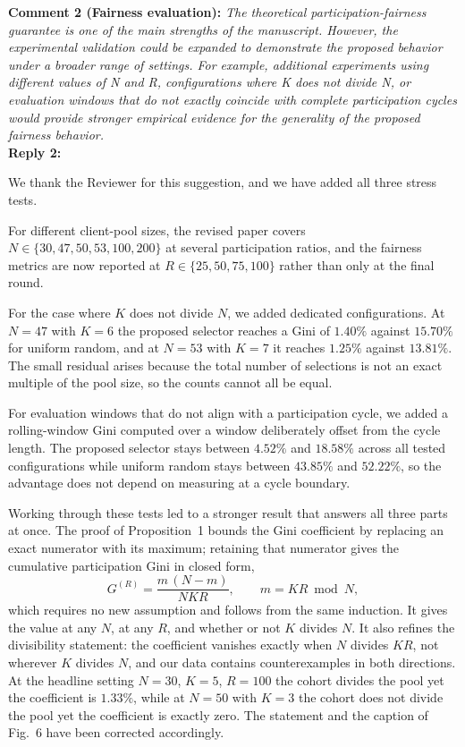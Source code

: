 \documentclass[10pt]{article}
\begin{document}
\noindent
\textbf{Comment 2 (Fairness evaluation):} \textit{The theoretical participation-fairness guarantee is one of the main strengths of the manuscript. However, the experimental validation could be expanded to demonstrate the proposed behavior under a broader range of settings. For example, additional experiments using different values of N and R, configurations where K does not divide N, or evaluation windows that do not exactly coincide with complete participation cycles would provide stronger empirical evidence for the generality of the proposed fairness behavior.} \\
\noindent
\textbf{Reply 2:} {We thank the Reviewer for this suggestion, and we have added all three stress tests.

For different client-pool sizes, the revised paper covers $N \in \{30, 47, 50, 53, 100, 200\}$ at several participation ratios, and the fairness metrics are now reported at $R \in \{25, 50, 75, 100\}$ rather than only at the final round.

For the case where $K$ does not divide $N$, we added dedicated configurations. At $N = 47$ with $K = 6$ the proposed selector reaches a Gini of $1.40\%$ against $15.70\%$ for uniform random, and at $N = 53$ with $K = 7$ it reaches $1.25\%$ against $13.81\%$. The small residual arises because the total number of selections is not an exact multiple of the pool size, so the counts cannot all be equal.

For evaluation windows that do not align with a participation cycle, we added a rolling-window Gini computed over a window deliberately offset from the cycle length. The proposed selector stays between $4.52\%$ and $18.58\%$ across all tested configurations while uniform random stays between $43.85\%$ and $52.22\%$, so the advantage does not depend on measuring at a cycle boundary.

Working through these tests led to a stronger result that answers all three parts at once. The proof of Proposition~1 bounds the Gini coefficient by replacing an exact numerator with its maximum; retaining that numerator gives the cumulative participation Gini in closed form,
\[
G^{(R)} = \frac{m\,(N-m)}{N K R}, \qquad m = KR \bmod N ,
\]
which requires no new assumption and follows from the same induction. It gives the value at any $N$, at any $R$, and whether or not $K$ divides $N$. It also refines the divisibility statement: the coefficient vanishes exactly when $N$ divides $KR$, not wherever $K$ divides $N$, and our data contains counterexamples in both directions. At the headline setting $N=30$, $K=5$, $R=100$ the cohort divides the pool yet the coefficient is $1.33\%$, while at $N=50$ with $K=3$ the cohort does not divide the pool yet the coefficient is exactly zero. The statement and the caption of Fig.~6 have been corrected accordingly.

}
\end{document}
